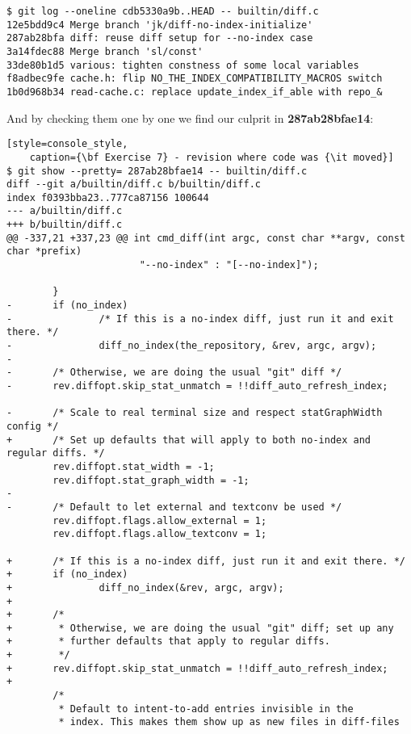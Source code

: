 \begin{lstlisting}[style=console_style,
	caption={\bf Exercise 7} - revisions to check]
$ git log --oneline cdb5330a9b..HEAD -- builtin/diff.c
12e5bdd9c4 Merge branch 'jk/diff-no-index-initialize'
287ab28bfa diff: reuse diff setup for --no-index case
3a14fdec88 Merge branch 'sl/const'
33de80b1d5 various: tighten constness of some local variables
f8adbec9fe cache.h: flip NO_THE_INDEX_COMPATIBILITY_MACROS switch
1b0d968b34 read-cache.c: replace update_index_if_able with repo_&
\end{lstlisting}

And by checking them one by one we find our culprit in {\bf 287ab28bfae14}:

\begin{lstlisting}[style=console_style,
	caption={\bf Exercise 7} - revision where code was {\it moved}]
$ git show --pretty= 287ab28bfae14 -- builtin/diff.c
diff --git a/builtin/diff.c b/builtin/diff.c
index f0393bba23..777ca87156 100644
--- a/builtin/diff.c
+++ b/builtin/diff.c
@@ -337,21 +337,23 @@ int cmd_diff(int argc, const char **argv, const char *prefix)
                       "--no-index" : "[--no-index]");
 
        }
-       if (no_index)
-               /* If this is a no-index diff, just run it and exit there. */
-               diff_no_index(the_repository, &rev, argc, argv);
-
-       /* Otherwise, we are doing the usual "git" diff */
-       rev.diffopt.skip_stat_unmatch = !!diff_auto_refresh_index;
 
-       /* Scale to real terminal size and respect statGraphWidth config */
+       /* Set up defaults that will apply to both no-index and regular diffs. */
        rev.diffopt.stat_width = -1;
        rev.diffopt.stat_graph_width = -1;
-
-       /* Default to let external and textconv be used */
        rev.diffopt.flags.allow_external = 1;
        rev.diffopt.flags.allow_textconv = 1;
 
+       /* If this is a no-index diff, just run it and exit there. */
+       if (no_index)
+               diff_no_index(&rev, argc, argv);
+
+       /*
+        * Otherwise, we are doing the usual "git" diff; set up any
+        * further defaults that apply to regular diffs.
+        */
+       rev.diffopt.skip_stat_unmatch = !!diff_auto_refresh_index;
+
        /*
         * Default to intent-to-add entries invisible in the
         * index. This makes them show up as new files in diff-files
\end{lstlisting}

